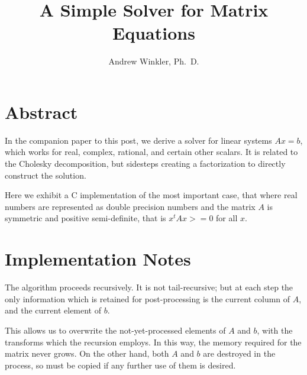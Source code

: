 \documentclass{article}
\title{A Simple Solver for Matrix Equations}
\author{Andrew Winkler, Ph.~D.}
\begin{document}
\maketitle

\section{Abstract}

In the companion paper to this post, we derive a solver for linear systems \begin{math}{}Ax=b\end{math}, which works for real, complex, rational,
and certain other scalars. It is related to the Cholesky decomposition, but sidesteps creating a factorization
to directly construct the solution.

Here we exhibit a C implementation of the most important case, that where
real numbers are represented as double precision numbers and the matrix \begin{math}A\end{math} is symmetric and positive semi-definite,
that is \begin{math}{}x^tAx >=0 \end{math} for all \begin{math}{}x\end{math}.

\section{Implementation Notes}
The algorithm proceeds recursively. It is not tail-recursive; but at each step
the only information which is retained for post-processing is the current column
of \begin{math}{}A\end{math}, and the current element of 
\begin{math}{}b\end{math}.

This allows us to overwrite the not-yet-processed elements of 
\begin{math}{}A\end{math} and \begin{math}{}b\end{math}, with the transforms
which the recursion employs. In this way, the memory required for the matrix
never grows. On the other hand, both 
\begin{math}{}A\end{math} and \begin{math}{}b\end{math} are destroyed in the process, so must be copied if any further use of them is desired.
\end{document}
